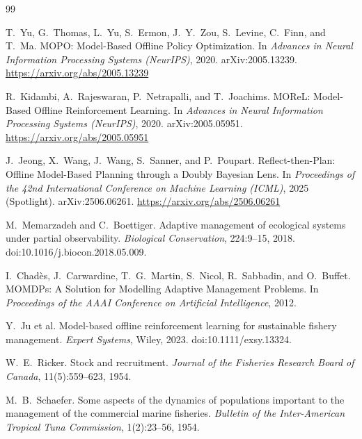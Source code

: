 \documentclass[11pt]{article}
\begin{document}
\newpage

{}
\begin{thebibliography}{99}

T.~Yu, G.~Thomas, L.~Yu, S.~Ermon, J.~Y.~Zou, S.~Levine, C.~Finn, and T.~Ma.
\newblock MOPO: Model-Based Offline Policy Optimization.
\newblock In \emph{Advances in Neural Information Processing Systems (NeurIPS)}, 2020.
\newblock arXiv:2005.13239. \url{https://arxiv.org/abs/2005.13239}

R.~Kidambi, A.~Rajeswaran, P.~Netrapalli, and T.~Joachims.
\newblock MOReL: Model-Based Offline Reinforcement Learning.
\newblock In \emph{Advances in Neural Information Processing Systems (NeurIPS)}, 2020.
\newblock arXiv:2005.05951. \url{https://arxiv.org/abs/2005.05951}

J.~Jeong, X.~Wang, J.~Wang, S.~Sanner, and P.~Poupart.
\newblock Reflect-then-Plan: Offline Model-Based Planning through a Doubly Bayesian Lens.
\newblock In \emph{Proceedings of the 42nd International Conference on Machine Learning (ICML)}, 2025 (Spotlight).
\newblock arXiv:2506.06261. \url{https://arxiv.org/abs/2506.06261}

M.~Memarzadeh and C.~Boettiger.
\newblock Adaptive management of ecological systems under partial observability.
\newblock \emph{Biological Conservation}, 224:9--15, 2018.
\newblock doi:10.1016/j.biocon.2018.05.009.

I.~Chad\`es, J.~Carwardine, T.~G.~Martin, S.~Nicol, R.~Sabbadin, and O.~Buffet.
\newblock MOMDPs: A Solution for Modelling Adaptive Management Problems.
\newblock In \emph{Proceedings of the AAAI Conference on Artificial Intelligence}, 2012.

Y.~Ju et al.
\newblock Model-based offline reinforcement learning for sustainable fishery management.
\newblock \emph{Expert Systems}, Wiley, 2023.
\newblock doi:10.1111/exsy.13324.

W.~E.~Ricker.
\newblock Stock and recruitment.
\newblock \emph{Journal of the Fisheries Research Board of Canada}, 11(5):559--623, 1954.

M.~B.~Schaefer.
\newblock Some aspects of the dynamics of populations important to the management of the commercial marine fisheries.
\newblock \emph{Bulletin of the Inter-American Tropical Tuna Commission}, 1(2):23--56, 1954.


\end{thebibliography}
\end{document}
